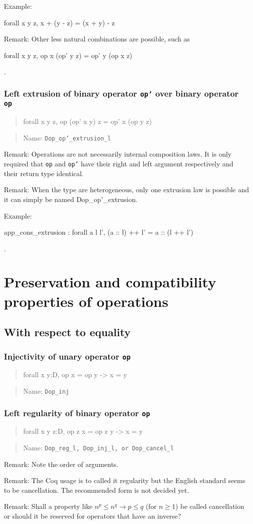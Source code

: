 \documentclass[a4paper]{article}
\newcommand\itemrule[3]{
\subsubsection{#1}
\begin{quote}
\begin{tt}
#3
\end{tt}
\end{quote}
\begin{quote}
Name: \texttt{#2}
\end{quote}}
\newcommand\formula[1]{\begin{tt}#1\end{tt}}
\newcommand\op{\texttt{op}}
\newcommand\opPrime{\texttt{op'}}
\begin{document}
Example: \formula{forall x y z, x + (y - z) = (x + y) - z}

Remark: Other less natural combinations are possible, such
as \formula{forall x y z, op x (op' y z) = op' y (op x z)}.

\itemrule{Left extrusion of binary operator {\opPrime} over binary operator {\op}}{Dop\_op'\_extrusion\_l}
{forall x y z, op (op' x y) z = op' x (op y z)}

Remark: Operations are not necessarily internal composition laws.  It
is only required that {\op} and {\opPrime} have their right and left
argument respectively and their return type identical.

Remark: When the type are heterogeneous, only one extrusion law is possible and it can simply be named {Dop\_op'\_extrusion}.

Example: \formula{app\_cons\_extrusion : forall a l l', (a :: l) ++ l' = a :: (l ++ l')}.





\section{Preservation and compatibility properties of operations}

\subsection{With respect to equality}

\itemrule{Injectivity of unary operator {\op}}{Dop\_inj}
{forall x y:D, op x = op y -> x = y}

\itemrule{Left regularity of binary operator {\op}}{Dop\_reg\_l, Dop\_inj\_l, or Dop\_cancel\_l}
{forall x y z:D, op z x = op z y -> x = y}

  Remark: Note the order of arguments.

  Remark: The Coq usage is to called it regularity but the English
  standard seems to be cancellation. The recommended form is not
  decided yet.

  Remark: Shall a property like $n^p \leq n^q \rightarrow p \leq q$
  (for $n\geq 1$) be called cancellation or should it be reserved for
  operators that have an inverse?
\end{document}
